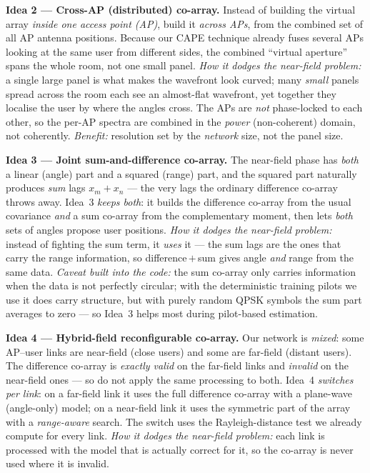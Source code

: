 \documentclass[10pt]{article}
\begin{document}
\begin{ideabox}
\textbf{Idea 2 --- Cross-AP (distributed) co-array.}
Instead of building the virtual array \emph{inside one access point (AP)}, build it \emph{across
APs}, from the combined set of all AP antenna positions. Because our CAPE technique already fuses
several APs looking at the same user from different sides, the combined ``virtual aperture'' spans
the whole room, not one small panel. \emph{How it dodges the near-field problem:} a single large
panel is what makes the wavefront look curved; many \emph{small} panels spread across the room each
see an almost-flat wavefront, yet together they localise the user by where the angles cross. The APs
are \emph{not} phase-locked to each other, so the per-AP spectra are combined in the \emph{power}
(non-coherent) domain, not coherently. \emph{Benefit:} resolution set by the \emph{network} size,
not the panel size.
\end{ideabox}

\begin{ideabox}
\textbf{Idea 3 --- Joint sum-and-difference co-array.}
The near-field phase has \emph{both} a linear (angle) part and a squared (range) part, and the
squared part naturally produces \emph{sum} lags $x_m+x_n$ --- the very lags the ordinary difference
co-array throws away. Idea~3 \emph{keeps both}: it builds the difference co-array from the usual
covariance \emph{and} a sum co-array from the complementary moment, then lets \emph{both} sets of
angles propose user positions. \emph{How it dodges the near-field problem:} instead of fighting the
sum term, it \emph{uses} it --- the sum lags are the ones that carry the range information, so
difference\,$+$\,sum gives angle \emph{and} range from the same data. \emph{Caveat built into the
code:} the sum co-array only carries information when the data is not perfectly circular; with the
deterministic training pilots we use it does carry structure, but with purely random QPSK symbols
the sum part averages to zero --- so Idea~3 helps most during pilot-based estimation.
\end{ideabox}

\begin{ideabox}
\textbf{Idea 4 --- Hybrid-field reconfigurable co-array.}
Our network is \emph{mixed}: some AP--user links are near-field (close users) and some are far-field
(distant users). The difference co-array is \emph{exactly valid} on the far-field links and
\emph{invalid} on the near-field ones --- so do not apply the same processing to both. Idea~4
\emph{switches per link}: on a far-field link it uses the full difference co-array with a plane-wave
(angle-only) model; on a near-field link it uses the symmetric part of the array with a
\emph{range-aware} search. The switch uses the Rayleigh-distance test we already compute for every
link. \emph{How it dodges the near-field problem:} each link is processed with the model that is
actually correct for it, so the co-array is never used where it is invalid.
\end{ideabox}
\end{document}
